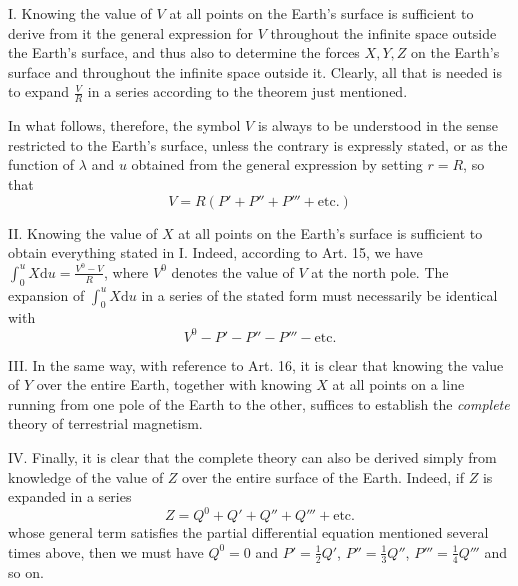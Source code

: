 I. Knowing the value of $V$ at all points on the Earth's surface is sufficient to derive from it the general expression for $V$ throughout the infinite space outside the Earth's surface, and thus also to determine the forces $X,Y,Z$ on the Earth's surface and throughout the infinite space outside it. Clearly, all that is needed is to expand $\frac VR$ in a series according to the theorem just mentioned.

In what follows, therefore, the symbol $V$ is always to be understood in the sense restricted to the Earth's surface, unless the contrary is expressly stated, or as the function of $\lambda$ and $u$ obtained from the general expression by setting $r=R$, so that
\[
V=R(P'+P''+P'''+\text{etc.})
\]

II. Knowing the value of $X$ at all points on the Earth's surface is sufficient to obtain everything stated in I. Indeed, according to Art. 15, we have $\int_0^u X\mathrm{d}u=\frac{V^0-V}{R}$, where $V^0$ denotes the value of $V$ at the north pole. The expansion of $\int_0^u X\mathrm{d}u$ in a series of the stated form must necessarily be identical with
\[
V^0-P'-P''-P'''-\text{etc.}
\]

III. In the same way, with reference to Art. 16, it is clear that knowing the value of $Y$ over the entire Earth, together with knowing $X$ at all points on a line running from one pole of the Earth to the other, suffices to establish the \textit{complete} theory of terrestrial magnetism.

IV. Finally, it is clear that the complete theory can also be derived simply from knowledge of the value of $Z$ over the entire surface of the Earth. Indeed, if $Z$ is expanded in a series
\[
Z=Q^0+Q'+Q''+Q'''+\text{etc.}
\]
whose general term satisfies the partial differential equation mentioned several times above, then we must have $Q^0=0$ and $P'=\frac12Q'$, $P''=\frac13Q''$, $P'''=\frac14Q'''$ and so on.

